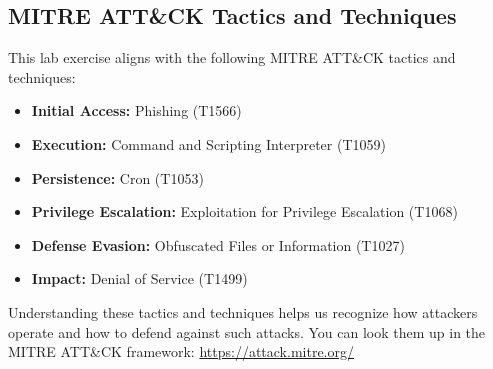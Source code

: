 \documentclass[12pt]{scrartcl}
\begin{document}
    \subsection{MITRE ATT\&CK Tactics and Techniques}
    \noindent
    This lab exercise aligns with the following MITRE ATT\&CK tactics and techniques:
    \begin{itemize}
        \item \textbf{Initial Access:} Phishing (T1566)
        \item \textbf{Execution:} Command and Scripting Interpreter (T1059)
        \item \textbf{Persistence:} Cron (T1053)
        \item \textbf{Privilege Escalation:} Exploitation for Privilege Escalation (T1068)
        \item \textbf{Defense Evasion:} Obfuscated Files or Information (T1027)
        \item \textbf{Impact:} Denial of Service (T1499)
    \end{itemize}
    \noindent
    Understanding these tactics and techniques helps us recognize how attackers operate and how to defend against such attacks.
    You can look them up in the MITRE ATT\&CK framework: \url{https://attack.mitre.org/}
\end{document}
